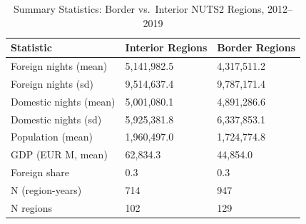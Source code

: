\begin{table}

\caption{\label{tab:summ_stats}Summary Statistics: Border vs.\ Interior NUTS2 Regions, 2012--2019}
\centering
\begin{tabular}[t]{lll}
\toprule
Statistic & Interior Regions & Border Regions\\
\midrule
Foreign nights (mean) & 5,141,982.5 & 4,317,511.2\\
Foreign nights (sd) & 9,514,637.4 & 9,787,171.4\\
Domestic nights (mean) & 5,001,080.1 & 4,891,286.6\\
Domestic nights (sd) & 5,925,381.8 & 6,337,853.1\\
Population (mean) & 1,960,497.0 & 1,724,774.8\\
\addlinespace
GDP (EUR M, mean) & 62,834.3 & 44,854.0\\
Foreign share & 0.3 & 0.3\\
N (region-years) & 714 & 947\\
N regions & 102 & 129\\
\bottomrule
\end{tabular}
\end{table}
